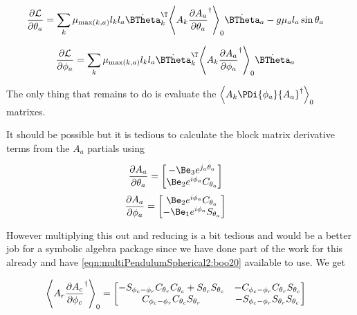 \begin{align}\label{eqn:multiPendulumSpherical2:boo41}
\PD{\theta_a}{\LL}
&=
\sum_{k}
\mu_{\max(k,a)} l_k l_a 
{\dot{\BTheta}_k}^\T
\gpgradezero{
A_k \PD{\theta_a}{A_a}^\dagger
} 
\dot{\BTheta}_a 
-g \mu_a l_a \sin\theta_a 
\end{align}

\begin{align}\label{eqn:multiPendulumSpherical2:boo40}
\PD{\phi_a}{\LL}
&=
\sum_{k}
\mu_{\max(k,a)} l_k l_a 
{\dot{\BTheta}_k}^\T
\gpgradezero{
A_k \PD{\phi_a}{A_a}^\dagger
} 
\dot{\BTheta}_a 
\end{align}

The only thing that remains to do is evaluate the $\gpgradezero{A_k \PDi{\phi_a}{A_a}^\dagger}$ matrixes.

It should be possible but it is tedious to calculate the block matrix derivative terms from the $A_a$ partials using

\begin{align}\label{eqn:multiPendulumSpherical2:boo10}
\PD{\theta_a}{A_a} &=
\begin{bmatrix}
-\Be_3 e^{j_a \theta_a} \\
\Be_2 e^{i \phi_a} C_{\theta_a}
\end{bmatrix}
\end{align}
\begin{align}\label{eqn:multiPendulumSpherical2:boo11}
\PD{\phi_a}{A_a}
&=
\begin{bmatrix}
\Be_2 e^{i \phi_a} C_{\theta_a} \\
-\Be_1 e^{i \phi_a} S_{\theta_a}
\end{bmatrix}
\end{align}

However multiplying this out and reducing is a bit tedious and would be a better job for a symbolic algebra package since we have done part of the work for this already and have \ref{eqn:multiPendulumSpherical2:boo20} available to use.  We get

\begin{align}\label{eqn:multiPendulumSpherical2:boo50}
\gpgradezero{ A_r \PD{\phi_c}{A_c}^\dagger }
&=
\begin{bmatrix}
-S_{\phi_c - \phi_r} C_{\theta_r} C_{\theta_c} + S_{\theta_r} S_{\theta_c} &
-C_{\phi_c - \phi_r} C_{\theta_r} S_{\theta_c} \\
C_{\phi_c - \phi_r} C_{\theta_c} S_{\theta_r} &
-S_{\phi_c - \phi_r} S_{\theta_r} S_{\theta_c} 
\end{bmatrix}
\end{align}

